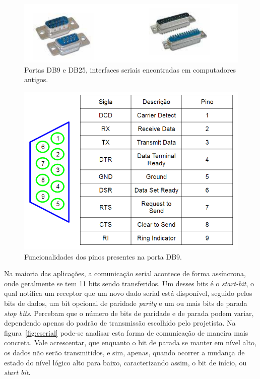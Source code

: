 \documentclass[12pt]{article}
\begin{document}
\begin{figure}[h]
\centering
\includegraphics[width=.5\textwidth]{img/fig8DB9DB25.png}
\caption{Portas DB9 e DB25, interfaces seriais encontradas em computadores antigos.}
\label{fig:db9db25}
\end{figure}


\begin{figure}[h]
\centering
\includegraphics[width=.5\textwidth]{img/Fig9serial_pinos.png}
\caption{Funcionalidades dos pinos presentes na porta DB9.}
\label{fig:pinosdb9}
\end{figure}



Na maioria das aplicações, a comunicação serial acontece de forma assíncrona, onde geralmente se tem 11 bits sendo transferidos. Um desses bits é o \textit{start-bit}, o qual notifica um receptor que um novo dado serial está disponível, seguido pelos bits de dados, um bit opcional de paridade \textit{parity} e um ou mais bits de parada \textit{stop bits}\cite{porta-serial}. Percebam que o número de bits de paridade e de parada podem variar, dependendo apenas do padrão de transmissão escolhido pelo projetista. Na figura~\ref{fig:cserial} pode-se analisar esta forma de comunicação de maneira mais concreta. Vale acrescentar, que enquanto o bit de parada se manter em nível alto, os dados não serão transmitidos, e sim, apenas, quando ocorrer a mudança de estado do nível lógico alto para baixo, caracterizando assim, o bit de início, ou \textit{start bit}. 

\end{document}
